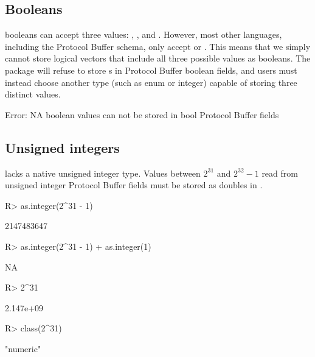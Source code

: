 \documentclass[article]{jss}
\begin{document}
\subsection{Booleans}

 booleans can accept three values: , , and
.  However, most other languages, including the Protocol
Buffer schema, only accept  or .  This means
that we simply cannot store  logical vectors that include all three
possible values as booleans.  The package will refuse to store
s in Protocol Buffer boolean fields, and users must instead
choose another type (such as enum or integer) capable of storing three
distinct values.
%
\begin{CodeChunk}
\begin{CodeOutput}
Error: NA boolean values can not be stored in bool Protocol Buffer fields
\end{CodeOutput}
\end{CodeChunk}

\subsection{Unsigned integers}

 lacks a native unsigned integer type.  Values between $2^{31}$ and
$2^{32} - 1$ read from unsigned integer Protocol Buffer fields must be
stored as doubles in .
%
\begin{Schunk}
\begin{Sinput}
R> as.integer(2^31 - 1)
\end{Sinput}
\begin{Soutput}
[1] 2147483647
\end{Soutput}
\begin{Sinput}
R> as.integer(2^31 - 1) + as.integer(1)
\end{Sinput}
\begin{Soutput}
[1] NA
\end{Soutput}
\begin{Sinput}
R> 2^31
\end{Sinput}
\begin{Soutput}
[1] 2.147e+09
\end{Soutput}
\begin{Sinput}
R> class(2^31)
\end{Sinput}
\begin{Soutput}
[1] "numeric"
\end{Soutput}
\end{Schunk}
\end{document}
